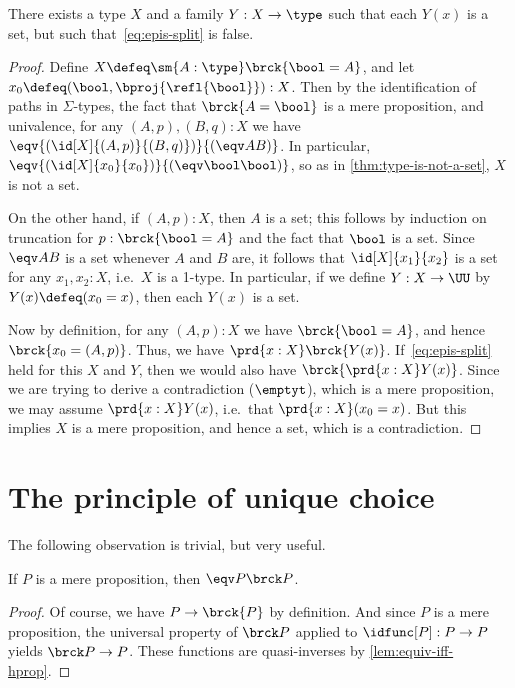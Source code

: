 \begin{lem}\label{thm:no-higher-ac}
  There exists a type $X$ and a family $Y:X\to \type$ such that each $Y(x)$ is a set, but such that~\eqref{eq:epis-split} is false.
\end{lem}
\begin{proof}
  Define $X\defeq \sm{A:\type} \brck{\bool = A}$, and let $x_0 \defeq (\bool, \bproj{\refl{\bool}}) : X$.
  Then by the identification of paths in $\Sigma$-types, the fact that $\brck{A=\bool}$ is a mere proposition, and univalence, for any $(A,p),(B,q):X$ we have $\eqv{(\id[X]{(A,p)}{(B,q)})}{(\eqv AB)}$.
  In particular, $\eqv{(\id[X]{x_0}{x_0})}{(\eqv \bool\bool)}$, so as in \cref{thm:type-is-not-a-set}, $X$ is not a set.

  On the other hand, if $(A,p):X$, then $A$ is a set; this follows by induction on truncation for $p:\brck{\bool=A}$ and the fact that $\bool$ is a set.
  Since $\eqv A B$ is a set whenever $A$ and $B$ are, it follows that $\id[X]{x_1}{x_2}$ is a set for any $x_1,x_2:X$, i.e.\ $X$ is a 1-type.
  In particular, if we define $Y:X\to\UU$ by $Y(x) \defeq (x_0=x)$, then each $Y(x)$ is a set.

  Now by definition, for any $(A,p):X$ we have $\brck{\bool=A}$, and hence $\brck{x_0 = (A,p)}$.
  Thus, we have $\prd{x:X} \brck{Y(x)}$.
  If~\eqref{eq:epis-split} held for this $X$ and $Y$, then we would also have $\brck{\prd{x:X} Y(x)}$.
  Since we are trying to derive a contradiction ($\emptyt$), which is a mere proposition, we may assume $\prd{x:X} Y(x)$, i.e.\ that $\prd{x:X} (x_0=x)$.
  But this implies $X$ is a mere proposition, and hence a set, which is a contradiction.
\end{proof}

%
%

\section{The principle of unique choice}
\label{sec:unique-choice}

%
%

The following observation is trivial, but very useful.

\begin{lem}\label{thm:prop-equiv-trunc}
  If $P$ is a mere proposition, then $\eqv P {\brck P}$.
\end{lem}
\begin{proof}
  Of course, we have $P\to \brck{P}$ by definition.
  And since $P$ is a mere proposition, the universal property of $\brck P$ applied to $\idfunc[P] :P\to P$ yields $\brck P \to P$.
  These functions are quasi-inverses by \cref{lem:equiv-iff-hprop}.
\end{proof}

